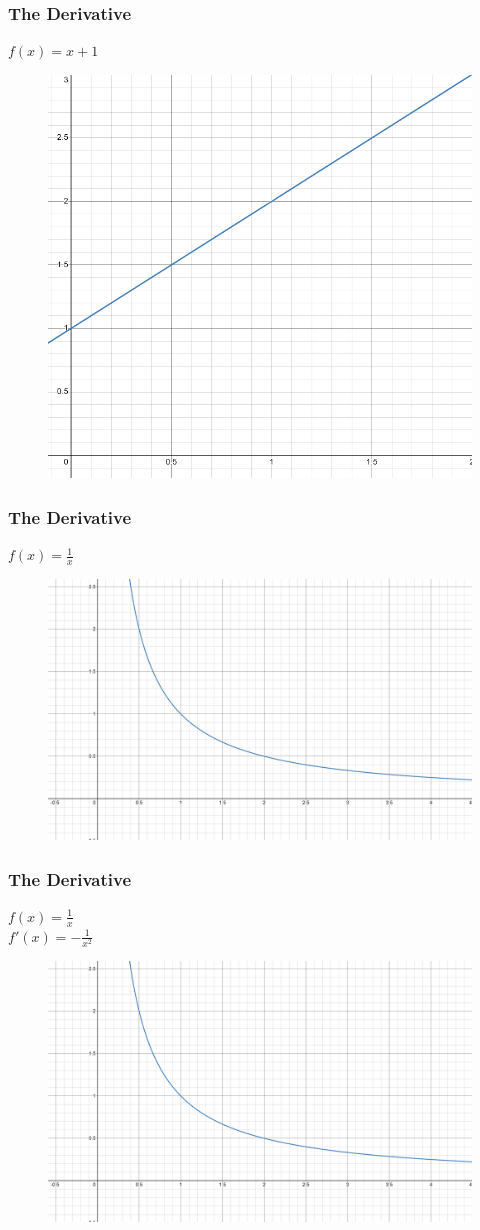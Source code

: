 \documentclass{beamer}
\begin{document}
    \begin{frame}
        \frametitle{The Derivative}
        \(f(x)=x+1\)\\[28.5pt]
        \begin{figure}
            \centering
            \includegraphics[width=0.6\linewidth]{include/images/limit_1.png}
        \end{figure}
    \end{frame}

    \begin{frame}
        \frametitle{The Derivative}
        \(f(x)=\frac{1}{x}\)\\[26pt]
        \begin{figure}
            \centering
            \includegraphics[width=0.6\linewidth]{include/images/invx_2.png}
        \end{figure}
    \end{frame}

    \begin{frame}
        \frametitle{The Derivative}
        \(f(x)=\frac{1}{x}\)\\
        \(f'(x)=-\frac{1}{x^2}\)\\[12pt]
        \begin{figure}
            \centering
            \includegraphics[width=0.6\linewidth]{include/images/invx_2.png}
        \end{figure}
    \end{frame}
\end{document}
